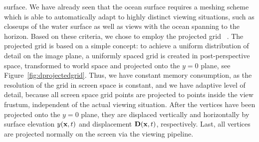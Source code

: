 surface.
We have already seen that the ocean surface requires a meshing scheme which is
able to automatically adapt to highly distinct viewing situations, such as
closeups of the water surface as well as views with the ocean spanning to the
horizon.
Based on these criteria, we chose to employ the projected grid
~\citep{Hinsinger:2002,thesis:johanson}. The projected grid is based on a
simple concept: to achieve a uniform distribution of detail on the image plane,
a uniformly spaced grid is created in post-perspective space, transformed to
world space and projected onto the $y=0$ plane, see
Figure~\ref{fig:dprojectedgrid}.
Thus, we have constant memory consumption, as the resolution of the grid in
screen space is constant, and we have adaptive level of detail, because all
screen space grid points are projected to points inside the view frustum,
independent of the actual viewing situation. After the vertices have been
projected onto the $y=0$ plane, they are displaced vertically and horizontally
by surface elevation $y(\mathbf{x},t)$ and displacement $\mathbf{D}(\mathbf{x},t)$,
respectively. Last, all vertices are projected normally on the screen via the
viewing pipeline.
%
